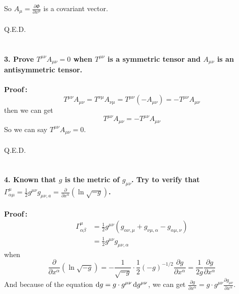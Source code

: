 \documentclass[12pt]{article}
\begin{document}
So $\displaystyle A_{\mu}=\frac{\partial\Phi}{\partial x^{\mu}}$ is a covariant vector.\\
~\\
Q.E.D.
~\\
~\\
~\\
\textbf{3. Prove $T^{\mu\nu}A_{\mu\nu}=0$ when $T^{\mu\nu}$ is a symmetric tensor and $A_{\mu\nu}$ is an antisymmetric tensor.} \\		
~\\
\textbf{Proof\,:} 
\begin{equation}
\displaystyle T^{\mu\nu}A_{\mu\nu}=T^{\nu\mu}A_{\nu\mu}=T^{\mu\nu}(-A_{\mu\nu})=-T^{\mu\nu}A_{\mu\nu}
	\tag{3.1}
\end{equation}
then we can get 
\begin{equation}
\displaystyle T^{\mu\nu}A_{\mu\nu}=-T^{\mu\nu}A_{\mu\nu}
	\tag{3.2}
\end{equation}
So we can say $T^{\mu\nu}A_{\mu\nu}=0$.\\
~\\
Q.E.D.
~\\
~\\
~\\
\textbf{4. Known that $g$ is the metric of $g_{\mu\nu}$. Try to verify that $\displaystyle \Gamma^{\mu}_{\alpha\mu}=\frac{1}{2}g^{\mu\nu}g_{\mu\nu,a}=\frac{\partial}{\partial x^{\alpha}}(\ln\sqrt{-g})$.} \\			%
~\\
\textbf{Proof\,:}
\begin{equation}
\begin{aligned}
\displaystyle 
\Gamma^{\mu}_{\alpha\beta} &= \frac{1}{2}g^{\mu\nu}(g_{\alpha\nu,\mu}+g_{\nu\mu,\alpha}-g_{\alpha\mu,\nu})\\
&=\frac{1}{2}g^{\mu\nu}g_{\mu\nu,\alpha}
\end{aligned}
	\tag{4.1}
\end{equation}
when
\begin{equation}
\displaystyle 
\frac{\partial}{\partial x^{\alpha}}(\ln\sqrt{-g})=-\frac{1}{\sqrt{-g}} \cdot \frac{1}{2}(-g)^{-1/2}\frac{\partial g}{\partial x^{\alpha}}=\frac{1}{2g}\frac{\partial g}{\partial x^{\alpha}}
	\tag{4.2}
\end{equation}
And because of the equation $\mathop{}\!\mathrm{d} g=g \cdot g^{\mu\nu}\mathop{}\!\mathrm{d} g^{\mu\nu}$, we can get $\displaystyle \frac{\partial g}{\partial x^{\alpha}}=g \cdot g^{\mu\nu}\frac{\partial g_{\mu\nu}}{\partial x^{\alpha}}$.\\
\end{document}
